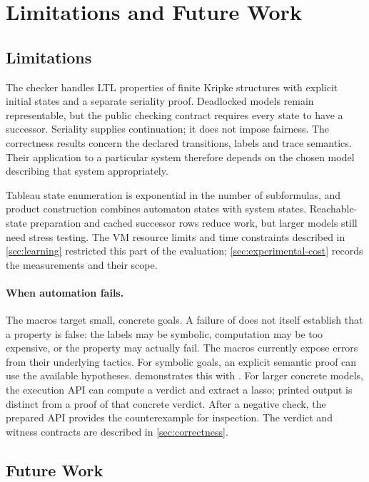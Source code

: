 \section{Limitations and Future Work}\label{sec:limitations}

\subsection{Limitations}

The checker handles LTL properties of finite Kripke structures with explicit
initial states and a separate seriality proof. Deadlocked models remain
representable, but the public checking contract requires every state to have
a successor. Seriality supplies continuation; it does not impose fairness.
The correctness results concern the declared transitions, labels and trace
semantics. Their application to a particular system therefore depends on the
chosen model describing that system appropriately.

Tableau state enumeration is exponential in the number of subformulas, and
product construction combines automaton states with system states.
Reachable-state preparation and cached successor rows reduce work, but larger
models still need stress testing. The VM resource limits and time constraints
described in \cref{sec:learning} restricted this part of the evaluation;
\cref{sec:experimental-cost} records the measurements and their scope.

\paragraph{When automation fails.}
The macros target small, concrete goals. A failure of 
does not itself establish that a property is false: the labels may be
symbolic, computation may be too expensive, or the property may actually
fail. The macros currently expose errors from their
underlying tactics. For symbolic goals, an explicit semantic proof can use
the available hypotheses.
 demonstrates this with
. For larger concrete models, the execution API can
compute a verdict and extract a lasso; printed output is distinct from a
proof of that concrete verdict. After a negative check, the prepared API
provides the counterexample for inspection. The verdict and witness contracts
are described in \cref{sec:correctness}.

\subsection{Future Work}

